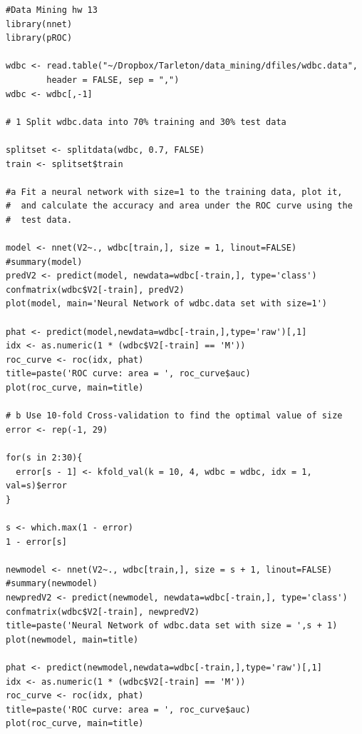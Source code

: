 \documentclass[11pt]{article}
\begin{document}
\newpage
\begin{Verbatim}
#Data Mining hw 13
library(nnet)
library(pROC)

wdbc <- read.table("~/Dropbox/Tarleton/data_mining/dfiles/wdbc.data", 
        header = FALSE, sep = ",")
wdbc <- wdbc[,-1]

# 1 Split wdbc.data into 70% training and 30% test data

splitset <- splitdata(wdbc, 0.7, FALSE)
train <- splitset$train

#a Fit a neural network with size=1 to the training data, plot it, 
#  and calculate the accuracy and area under the ROC curve using the 
#  test data.

model <- nnet(V2~., wdbc[train,], size = 1, linout=FALSE)
#summary(model)
predV2 <- predict(model, newdata=wdbc[-train,], type='class')
confmatrix(wdbc$V2[-train], predV2)
plot(model, main='Neural Network of wdbc.data set with size=1')

phat <- predict(model,newdata=wdbc[-train,],type='raw')[,1]
idx <- as.numeric(1 * (wdbc$V2[-train] == 'M'))
roc_curve <- roc(idx, phat)
title=paste('ROC curve: area = ', roc_curve$auc)
plot(roc_curve, main=title)

# b Use 10-fold Cross-validation to find the optimal value of size
error <- rep(-1, 29)

for(s in 2:30){
  error[s - 1] <- kfold_val(k = 10, 4, wdbc = wdbc, idx = 1, val=s)$error
}

s <- which.max(1 - error)
1 - error[s]

newmodel <- nnet(V2~., wdbc[train,], size = s + 1, linout=FALSE)
#summary(newmodel)
newpredV2 <- predict(newmodel, newdata=wdbc[-train,], type='class')
confmatrix(wdbc$V2[-train], newpredV2)
title=paste('Neural Network of wdbc.data set with size = ',s + 1)
plot(newmodel, main=title) 

phat <- predict(newmodel,newdata=wdbc[-train,],type='raw')[,1]
idx <- as.numeric(1 * (wdbc$V2[-train] == 'M'))
roc_curve <- roc(idx, phat)
title=paste('ROC curve: area = ', roc_curve$auc)
plot(roc_curve, main=title)
\end{Verbatim}
\end{document}
